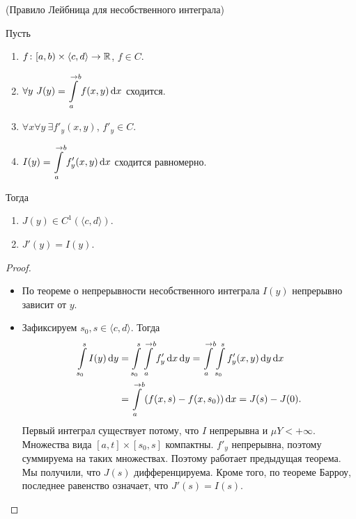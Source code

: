\begin{theorem}(Правило Лейбница для несобственного интеграла)

    Пусть 
    \begin{enumerate}
        \item $f \colon [a, b) \times \langle c, d \rangle \to \mathbb{R}$, $f \in C$.
        \item $\displaystyle \forall y~ J(y) = \int\limits_a^{\to b}{f(x, y) \,\mathrm{d} x}$ сходится. 
        \item $\forall x \forall y~ \exists f'_y(x, y)$, $f'_y \in C$.
        \item $\displaystyle I(y) = \int\limits_a^{\to b}{f'_y(x, y) \,\mathrm{d} x}$ сходится равномерно.
    \end{enumerate}
    Тогда
    \begin{enumerate}
        \item $J(y) \in C^1(\langle c, d \rangle)$.
        \item $J'(y) = I(y)$.
    \end{enumerate}
\end{theorem}
\begin{proof}
    \enewline
    \begin{itemize}
        \item По теореме о непрерывности несобственного интеграла $I(y)$ непрерывно зависит от $y$.
        \item Зафиксируем $s_0, s \in \langle c, d \rangle$. Тогда
            \begin{align*}
                \int\limits_{s_0}^s{I(y) \,\mathrm{d} y} 
                 &= \int\limits_{s_0}^s{\int\limits_a^{\to b}{f'_y \,\mathrm{d} x} \,\mathrm{d} y} =
                 \int\limits_a^{\to b}{\int\limits_{s_0}^s{f'_y(x, y) \,\mathrm{d} y} \,\mathrm{d} x} \\
                 &= \int\limits_a^{\to b}{(f(x, s) - f(x, s_0)) \,\mathrm{d} x} = J(s) - J(0)
             .\end{align*}
             Первый интеграл существует потому, что $I$ непрерывна и $\mu{Y} < +\infty$. Множества
             вида $[a, t] \times [s_0, s]$ компактны. $f'_y$ непрерывна, поэтому суммируема на таких множествах.
             Поэтому работает предыдущая теорема.
             Мы получили, что $J(s)$ дифференцируема. Кроме того, по теореме Барроу, последнее 
             равенство означает, что $J'(s) = I(s)$.
        \end{itemize}
\end{proof}

